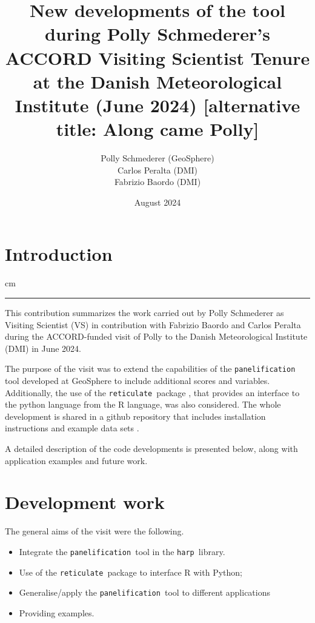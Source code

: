 \documentclass[11pt,a4paper]{article}
\date{}
\title{New developments of the \panels tool during Polly Schmederer's ACCORD Visiting Scientist Tenure at the Danish Meteorological Institute (June 2024) [alternative title: Along came Polly]}
\author{Polly Schmederer (GeoSphere) \\ Carlos Peralta (DMI) \\ Fabrizio Baordo (DMI)}
\date{August 2024}
\newcommand{\retis}{\texttt{reticulate }}
\newcommand{\panels}{\texttt{panelification }}
\newcommand{\harps}{\texttt{harp }}
\newcommand {\sectionrule}{\vskip -0.9 cm
\color {mygray} \rule [0 cm] {17 cm}{0.1 mm} \color {black}}
\begin{document}
\maketitle
\thispagestyle{fancy}

\section{Introduction}
\sectionrule
This contribution summarizes the work carried out by Polly Schmederer as Visiting Scientist (VS) in contribution with Fabrizio Baordo
and Carlos Peralta during the ACCORD-funded visit of Polly to the Danish Meteorological Institute (DMI) in June 2024.

The purpose of the visit was to extend the capabilities of the \panels tool \cite{panel_tool} developed at GeoSphere to include additional scores and variables. 
Additionally, the use of the \retis package \cite{reticulate}, that provides an interface to the python language from the R language, was also considered.
The whole development is shared in a github repository that includes installation instructions and example data sets \cite{repo}.

A detailed description of the code developments is presented below, along with application examples and future work.


\section{Development work}
The general aims of the visit were the following.
\begin{itemize}
    \item Integrate the \panels tool in the \harps library.
    \item Use of the \retis package to interface R with Python;
    \item Generalise/apply the \panels tool to different applications
    \item Providing examples.
\end{itemize}
\end{document}
